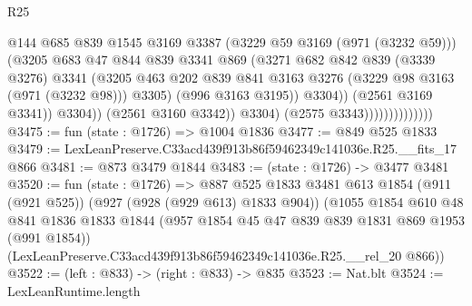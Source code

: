 \begin{lexlean}{R25}
\begin{coremodule}
                                          @144
                                          @685
                                          @839
                                          @1545
                                          @3169
                                          @3387
                                          (@3229 @59 @3169 (@971 (@3232 @59)))
                                          (@3205
                                            @683
                                            @47
                                            @844
                                            @839
                                            @3341
                                            @869
                                            (@3271
                                              @682
                                              @842
                                              @839
                                              (@3339 @3276)
                                              @3341
                                              (@3205
                                                @463
                                                @202
                                                @839
                                                @841
                                                @3163
                                                @3276
                                                (@3229 @98 @3163 (@971 (@3232 @98)))
                                                @3305)
                                              (@996 @3163 @3195))
                                            @3304))
                                        (@2561 @3169 @3341))
                                      @3304))
                                  (@2561 @3160 @3342))
                                @3304)
                              (@2575 @3343))))))))))))))
@3475 := fun (state : @1726) => @1004 @1836
@3477 := @849 @525 @1833
@3479 := LexLeanPreserve.C33acd439f913b86f59462349c141036e.R25.__fits_17 @866
@3481 := @873 @3479 @1844
@3483 := (state : @1726) -> @3477 @3481
@3520 := fun (state : @1726) =>
  @887
    @525
    @1833
    @3481
    @613
    @1854
    (@911 (@921 @525))
    (@927 (@928 (@929 @613) @1833 @904))
    (@1055
      @1854
      @610
      @48
      @841
      @1836
      @1833
      @1844
      (@957 @1854 @45 @47 @839 @839 @1831 @869 @1953 (@991 @1854))
      (LexLeanPreserve.C33acd439f913b86f59462349c141036e.R25.__rel_20 @866))
@3522 := (left : @833) -> (right : @833) -> @835
@3523 := Nat.blt
@3524 := LexLeanRuntime.length

\end{coremodule}
\end{lexlean}
